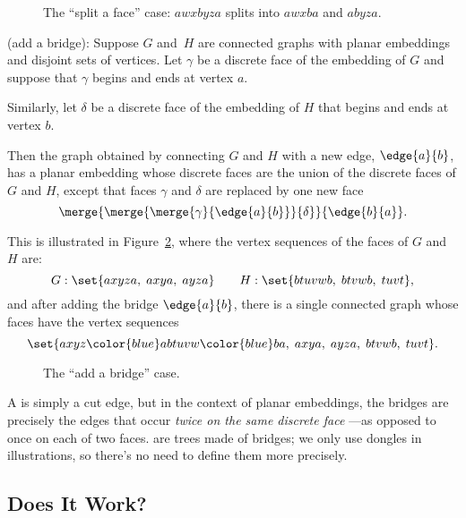 \begin{definition}
\begin{figure}


\caption{The ``split a face'' case: $awxbyza$ splits into $awxba$ and $abyza$.}
\label{fig:face-splitting}
\end{figure}

 (add a bridge): Suppose $G$ and~$H$
are connected graphs with planar embeddings and disjoint sets of
vertices.  Let $\gamma$ be a discrete face of the embedding of $G$ and
suppose that $\gamma$ begins and ends at vertex $a$.
\iffalse
That is, $\gamma$ is of the form
\[
a\dots a.
\]
\fi

Similarly, let $\delta$ be a discrete face of the embedding of $H$
that begins and ends at vertex $b$.
\iffalse
So $\delta$ is of the form
\[
b\cdots b.
\]
\fi

Then the graph obtained by connecting $G$ and $H$ with a new edge,
$\edge{a}{b}$, has a planar embedding whose discrete faces are the
union of the discrete faces of $G$ and $H$, except that faces $\gamma$
and $\delta$ are replaced by one new face
\[
\merge{\merge{\merge{\gamma}{\edge{a}{b}}}{\delta}}{\edge{b}{a}}.
\]

This is illustrated in Figure~\ref{fig:add-bridge}, where the vertex
sequences of the faces of $G$ and $H$ are:
\[
G: \set{ axyza,\; axya,\; ayza }
    \qquad H: \set{ btuvwb,\; btvwb,\; tuvt },
\]
and after adding the bridge $\edge{a}{b}$, there is a
single connected graph whose faces have the vertex sequences
\[
\set{ axyz{\color{blue}ab}tuvw{\color{blue}ba},\;
         axya,\; ayza,\; btvwb,\; tuvt }.
\]

\begin{figure}


\caption{The ``add a bridge'' case.}
\label{fig:add-bridge}
\end{figure}

\end{definition}

A  is simply a cut edge, but in the context of planar
embeddings, the bridges are precisely the edges that occur \emph{twice
  on the same discrete face} ---as opposed to once on each of two
faces.   are trees made of bridges; we only use dongles
in illustrations, so there's no need to define them more precisely.

\subsection{Does It Work?}

